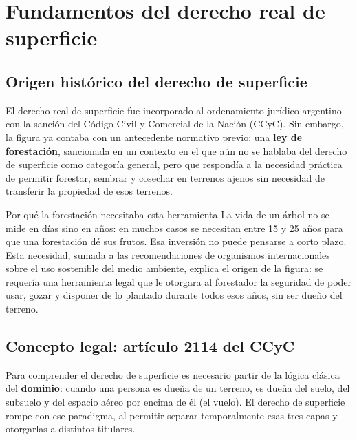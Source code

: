 \documentclass[12pt,oneside]{book}
\begin{document}
\chapter{Fundamentos del derecho real de superficie}

\section{Origen histórico del derecho de superficie}

El derecho real de superficie fue incorporado al ordenamiento jurídico argentino con la sanción del Código Civil y Comercial de la Nación (CCyC). Sin embargo, la figura ya contaba con un antecedente normativo previo: una \textbf{ley de forestación}, sancionada en un contexto en el que aún no se hablaba del derecho de superficie como categoría general, pero que respondía a la necesidad práctica de permitir forestar, sembrar y cosechar en terrenos ajenos sin necesidad de transferir la propiedad de esos terrenos.

\begin{example}{Por qué la forestación necesitaba esta herramienta}
La vida de un árbol no se mide en días sino en años: en muchos casos se necesitan entre 15 y 25 años para que una forestación dé sus frutos. Esa inversión no puede pensarse a corto plazo. Esta necesidad, sumada a las recomendaciones de organismos internacionales sobre el uso sostenible del medio ambiente, explica el origen de la figura: se requería una herramienta legal que le otorgara al forestador la seguridad de poder usar, gozar y disponer de lo plantado durante todos esos años, sin ser dueño del terreno.
\end{example}

\section{Concepto legal: artículo 2114 del CCyC}

Para comprender el derecho de superficie es necesario partir de la lógica clásica del \textbf{dominio}: cuando una persona es dueña de un terreno, es dueña del suelo, del subsuelo y del espacio aéreo por encima de él (el vuelo). El derecho de superficie rompe con ese paradigma, al permitir separar temporalmente esas tres capas y otorgarlas a distintos titulares.
\end{document}
